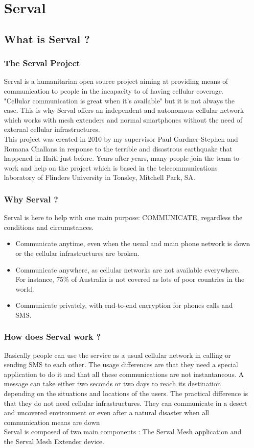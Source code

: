 \chapter{Serval}

\section{What is Serval ?}

\subsection{The Serval Project}
Serval is a humanitarian open source project aiming at providing means of communication to people in the incapacity to of having cellular coverage. "Cellular communication is great when it's available" but it is not always the case. This is why Serval offers an independent and autonomous cellular network which works with mesh extenders and normal smartphones without the need of external cellular infrastructures. \\
This project was created in 2010 by my supervisor Paul Gardner-Stephen and Romana Challans in response to the terrible and disastrous earthquake that happened in Haiti just before. Years after years, many people join the team to work and help on the project which is based in the telecommunications laboratory of Flinders University in Tonsley, Mitchell Park, SA. 

\subsection{Why Serval ?}
Serval is here to help with one main purpose: COMMUNICATE, regardless the conditions and circumstances.
\begin{itemize}
\item Communicate anytime, even when the usual and main phone network is down or the cellular infrastructures are broken.
\item Communicate anywhere, as cellular networks are not available everywhere. For instance, 75\% of Australia is not covered as lots of poor countries in the world. 
\item Communicate privately, with end-to-end encryption for phones calls and SMS.
\end{itemize}

\subsection{How does Serval work ?}
Basically people can use the service as a usual cellular network in calling or sending SMS to each other. The usage differences are that they need a special application to do it and that all these communications are not instantaneous. A message can take either two seconds or two days to reach its destination depending on the situations and locations of the users. The practical difference is that they do not need cellular infrastructures. They can communicate in a desert and uncovered environment or even after a natural disaster when all communication means are down\\
Serval is composed of two main components : The Serval Mesh application and the Serval Mesh Extender device. 

